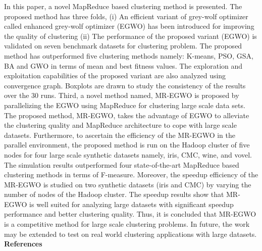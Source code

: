 \documentclass[review]{elsarticle}
\begin{document}
In this paper, a novel MapReduce based clustering method is presented. The proposed method has three folds, (i) An efficient variant of grey-wolf optimizer called enhanced grey-wolf optimizer (EGWO) has been introduced for improving the quality of clustering (ii) The performance of the proposed variant (EGWO) is validated on seven benchmark datasets for clustering problem. The proposed method has outperformed five clustering methods namely: K-means, PSO, GSA, BA and GWO in terms of mean and best fitness values. The exploration and exploitation capabilities of the proposed variant are also analyzed using convergence graph. Boxplots are drawn to study the consistency of the results over the 30 runs. Third, a novel method named, MR-EGWO is proposed by parallelizing the EGWO using MapReduce for clustering large scale data sets. The proposed method, MR-EGWO, takes the advantage of EGWO to alleviate the clustering quality and MapReduce architecture to cope with large scale datasets. Furthermore, to ascertain the efficiency of the MR-EGWO in the parallel environment, the proposed method is run on the Hadoop cluster of five nodes for four large scale synthetic datasets namely, iris, CMC, wine, and vovel. The simulation results outperformed four state-of-the-art MapReduce based clustering methods in terms of F-measure. Moreover, the speedup efficiency of the MR-EGWO is studied on two synthetic datasets (iris and CMC) by varying the number of nodes of the Hadoop cluster. The speedup results show that MR-EGWO is well suited for analyzing large datasets with significant speedup performance and better clustering quality. Thus, it is concluded that MR-EGWO is a competitive method for large scale clustering problems. In future, the work may be extended to test on real world clustering applications with large datasets.\\
\textbf{References}
\end{document}

